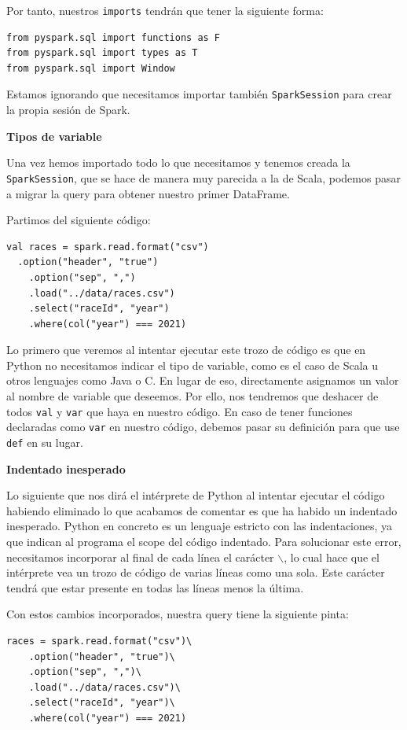 \documentclass[12pt,twoside,titlepage]{report}
\begin{document}
Por tanto, nuestros \texttt{imports} tendrán que tener la siguiente forma:

\begin{lstlisting}
from pyspark.sql import functions as F
from pyspark.sql import types as T
from pyspark.sql import Window
\end{lstlisting}

Estamos ignorando que necesitamos importar también \texttt{SparkSession} para crear la propia sesión de Spark.

\textbf{Tipos de variable}

Una vez hemos importado todo lo que necesitamos y tenemos creada la \texttt{SparkSession}, que se hace de manera muy parecida a la de Scala, podemos pasar a migrar la query para obtener nuestro primer DataFrame.

Partimos del siguiente código:

\begin{lstlisting}
val races = spark.read.format("csv")
  .option("header", "true")
	.option("sep", ",")
	.load("../data/races.csv")
	.select("raceId", "year")
	.where(col("year") === 2021)
\end{lstlisting}

Lo primero que veremos al intentar ejecutar este trozo de código es que en Python no necesitamos indicar el tipo
de variable, como es el caso de Scala u otros lenguajes como Java o C. En lugar de eso, directamente asignamos un valor al nombre de variable que deseemos. Por ello, nos tendremos que deshacer de todos \texttt{val} y \texttt{var} que haya en nuestro código. En caso de tener funciones declaradas como \texttt{var} en nuestro código, debemos pasar su definición para que use \texttt{def} en su lugar.

\textbf{Indentado inesperado}

Lo siguiente que nos dirá el intérprete de Python al intentar ejecutar el código habiendo eliminado lo que acabamos de comentar es que ha habido un indentado inesperado. Python en concreto es un lenguaje estricto con las indentaciones, ya que indican al programa el scope del código indentado. Para solucionar este error, necesitamos incorporar al final de cada línea el carácter \texttt{$\backslash$}, lo cual hace que el intérprete vea un trozo de código de varias líneas como una sola. Este carácter tendrá que estar presente en todas las líneas menos la última.

Con estos cambios incorporados, nuestra query tiene la siguiente pinta:

\begin{lstlisting}
races = spark.read.format("csv")\
	.option("header", "true")\
	.option("sep", ",")\
	.load("../data/races.csv")\
	.select("raceId", "year")\
	.where(col("year") === 2021)
\end{lstlisting}
\end{document}
